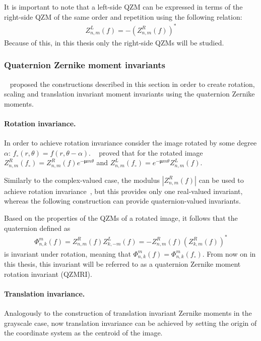 It is important to note that a left-side QZM can be expressed in terms of the right-side QZM of the same order and repetition using the following relation:
\begin{gather*}
    Z_{n,m}^L(f) = -(Z_{n,m}^R(f))^{*}
\end{gather*}
Because of this, in this thesis only the right-side QZMs will be studied.

\subsubsection{Quaternion Zernike moment invariants}\label{sec:invariance}
\citeauthor{qzmi}~\cite{qzm, qzmi} proposed the constructions described in this section in order to create rotation, scaling and translation invariant moment invariants using the quaternion Zernike moments.

\paragraph{Rotation invariance.}
In order to achieve rotation invariance consider the image rotated by some degree $\alpha$: $f_{\circ}(r,\theta) = f(r, \theta - \alpha)$. \citeauthor{qzmi}~\cite{qzmi} proved that for the rotated image $Z_{n,m}^R(f_{\circ}) = Z_{n,m}^R(f)e^{-\bm{\mu}m\theta}$ and $Z_{n,m}^L(f_{\circ}) = e^{-\bm{\mu}m\theta}Z_{n,m}^L(f)$. 


Similarly to the complex-valued case, the modulus $|Z_{n,m}^R(f)|$ can be used to achieve rotation invariance~\cite{qzm}, but this provides only one real-valued invariant, whereas the following construction can provide quaternion-valued invariants. 


Based on the properties of the QZMs of a rotated image, it follows that the quaternion defined as
\begin{gather}
\Phi_{n,k}^m(f) = Z_{n,m}^R(f)Z_{k,-m}^L(f) = -Z_{n,m}^R(f)(Z_{k,m}^R(f))^* \label{eq:rot_inv}
\end{gather}
is invariant under rotation, meaning that $\Phi_{n,k}^m(f) = \Phi_{n,k}^m(f_{\circ})$.
From now on in this thesis, this invariant will be referred to as a quaternion Zernike moment rotation invariant (QZMRI).

\paragraph{Translation invariance.}
Analogously to the construction of translation invariant Zernike moments in the grayscale case, now translation invariance can be achieved by setting the origin of the coordinate system as the centroid of the image.


